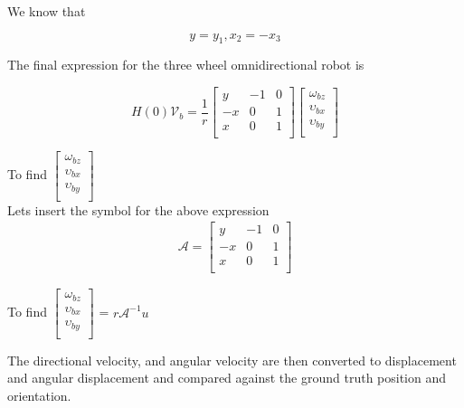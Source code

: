 \documentclass[12pt, twoside]{report}
\begin{document}
We know that

\begin{equation}
    y = y_1,  x_2 = -x_3
\end{equation}

The final expression for the three wheel omnidirectional robot is

\begin{equation}
    H(0)\mathcal{V}_b = \frac{1}{r}
    \begin{bmatrix}
        y  & -1 & 0 \\
        -x & 0  & 1 \\
        x  & 0  & 1 \\
    \end{bmatrix}
    \begin{bmatrix}
        \omega_{bz}   \\
        \upsilon_{bx} \\
        \upsilon_{by} \\
    \end{bmatrix}
\end{equation}

To find
$
    \begin{bmatrix}
        \omega_{bz}   \\
        \upsilon_{bx} \\
        \upsilon_{by} \\
    \end{bmatrix}
$\\

Lets insert the symbol for the above expression
\begin{align}
    \mathcal{A}  =
    \begin{bmatrix}
        y  & -1 & 0 \\
        -x & 0  & 1 \\
        x  & 0  & 1 \\
    \end{bmatrix}
\end{align}


To find
$
    \begin{bmatrix}
        \omega_{bz}   \\
        \upsilon_{bx} \\
        \upsilon_{by} \\
    \end{bmatrix}
$ = $r\mathcal{A}^{-1} u$

The directional velocity, and angular velocity are then converted to displacement and angular displacement
and compared against
the ground truth position and orientation.
\end{document}
